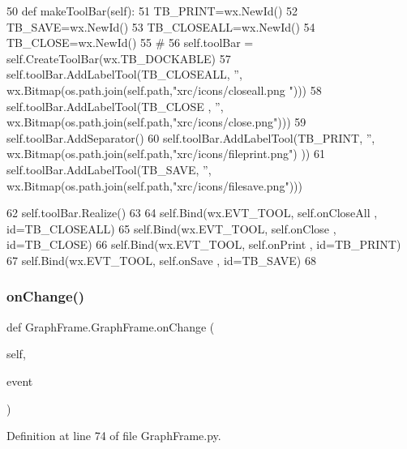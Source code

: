 \begin{DoxyCode}
50     \textcolor{keyword}{def }makeToolBar(self):
51         TB\_PRINT=wx.NewId()
52         TB\_SAVE=wx.NewId()
53         TB\_CLOSEALL=wx.NewId()
54         TB\_CLOSE=wx.NewId()
55         \textcolor{comment}{#}
56         self.toolBar = self.CreateToolBar(wx.TB\_DOCKABLE)
57         self.toolBar.AddLabelTool(TB\_CLOSEALL, \textcolor{stringliteral}{''}, wx.Bitmap(os.path.join(self.path,\textcolor{stringliteral}{"xrc/icons/closeall.png
      "})))
58         self.toolBar.AddLabelTool(TB\_CLOSE  , \textcolor{stringliteral}{''}, wx.Bitmap(os.path.join(self.path,\textcolor{stringliteral}{"xrc/icons/close.png"})))
59         self.toolBar.AddSeparator()        
60         self.toolBar.AddLabelTool(TB\_PRINT, \textcolor{stringliteral}{''}, wx.Bitmap(os.path.join(self.path,\textcolor{stringliteral}{"xrc/icons/fileprint.png"})
      ))
61         self.toolBar.AddLabelTool(TB\_SAVE, \textcolor{stringliteral}{''}, wx.Bitmap(os.path.join(self.path,\textcolor{stringliteral}{"xrc/icons/filesave.png"})))
              
62         self.toolBar.Realize()
63 
64         self.Bind(wx.EVT\_TOOL, self.onCloseAll , id=TB\_CLOSEALL)
65         self.Bind(wx.EVT\_TOOL, self.onClose , id=TB\_CLOSE)
66         self.Bind(wx.EVT\_TOOL, self.onPrint , id=TB\_PRINT)
67         self.Bind(wx.EVT\_TOOL, self.onSave  , id=TB\_SAVE)
68                         
\end{DoxyCode}
\mbox{\label{classGraphFrame_1_1GraphFrame_a46ef6b8a00bb885e5546bb7e12ef6223}} 
\subsubsection{\texorpdfstring{on\+Change()}{onChange()}}
{\footnotesize\ttfamily def Graph\+Frame.\+Graph\+Frame.\+on\+Change (\begin{DoxyParamCaption}\item[{}]{self,  }\item[{}]{event }\end{DoxyParamCaption})}



Definition at line 74 of file Graph\+Frame.\+py.



